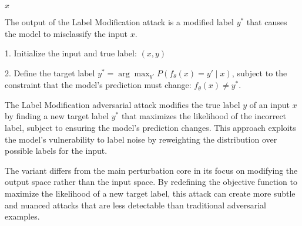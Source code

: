 $x$

The output of the Label Modification attack is a modified label $y^*$ that causes the model to misclassify the input $x$.

1. Initialize the input and true label:
$(x, y)$

2. Define the target label $y^* = \arg\max_{y'} P(f_{\theta}(x) = y' \mid x)$,
subject to the constraint that the model's prediction must change:
$f_{\theta}(x) \neq y^*$.

The Label Modification adversarial attack modifies the true label $y$ of an input $x$ by finding a new target label $y^*$ that maximizes the likelihood of the incorrect label, subject to ensuring the model's prediction changes. This approach exploits the model's vulnerability to label noise by reweighting the distribution over possible labels for the input.

The variant differs from the main perturbation core in its focus on modifying the output space rather than the input space. By redefining the objective function to maximize the likelihood of a new target label, this attack can create more subtle and nuanced attacks that are less detectable than traditional adversarial examples.